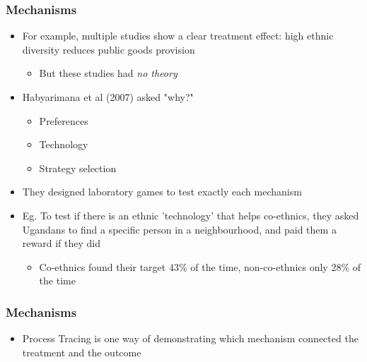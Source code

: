 \documentclass[xcolor=x11names,compress]{beamer}\usepackage[]{graphicx}\usepackage[]{color}
\renewcommand{\(}{\begin{columns}}
\renewcommand{\)}{\end{columns}}
\newcommand{\<}[1]{\begin{column}{#1}}
\renewcommand{\>}{\end{column}}
\begin{document}
\begin{frame}
\frametitle{Mechanisms}
\begin{itemize}
\item For example, multiple studies show a clear treatment effect: high ethnic diversity reduces public goods provision
\begin{itemize}
\item But these studies had \textit{no theory}
\end{itemize}
\item Habyarimana et al (2007) asked "why?"
\begin{itemize}
\item Preferences
\item Technology
\item Strategy selection
\end{itemize}
\item They designed laboratory games to test exactly each mechanism
\item Eg. To test if there is an ethnic 'technology' that helps co-ethnics, they asked Ugandans to find a specific person in a neighbourhood, and paid them a reward if they did
\begin{itemize}
\item Co-ethnics found their target 43\% of the time, non-co-ethnics only 28\% of the time
\end{itemize}
\end{itemize}
\end{frame}

\begin{frame}
\frametitle{Mechanisms}
\begin{itemize}
\item Process Tracing is one way of demonstrating which mechanism connected the treatment and the outcome 
\end{itemize}
\end{frame}

 
\end{document}
